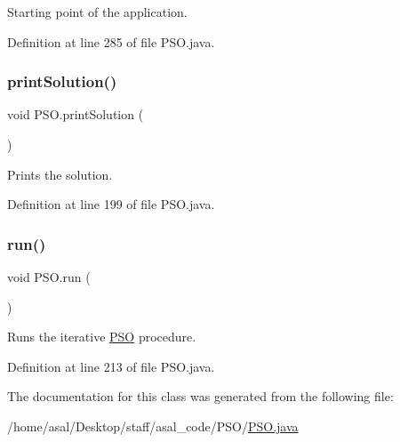 Starting point of the application. 

Definition at line 285 of file P\+S\+O.\+java.

\mbox{\label{class_p_s_o_a83a2cd74d2176ea147b84e17050ceffb}} 
\subsubsection{\texorpdfstring{print\+Solution()}{printSolution()}}
{\footnotesize\ttfamily void P\+S\+O.\+print\+Solution (\begin{DoxyParamCaption}{ }\end{DoxyParamCaption})}

Prints the solution. 

Definition at line 199 of file P\+S\+O.\+java.

\mbox{\label{class_p_s_o_a689d26e00d138c809a4de0a34e98cd0a}} 
\subsubsection{\texorpdfstring{run()}{run()}}
{\footnotesize\ttfamily void P\+S\+O.\+run (\begin{DoxyParamCaption}{ }\end{DoxyParamCaption})}

Runs the iterative \hyperlink{class_p_s_o}{P\+SO} procedure. 

Definition at line 213 of file P\+S\+O.\+java.



The documentation for this class was generated from the following file\+:\begin{DoxyCompactItemize}
\item 
/home/asal/\+Desktop/staff/asal\+\_\+code/\+P\+S\+O/\hyperlink{_p_s_o_8java}{P\+S\+O.\+java}\end{DoxyCompactItemize}
